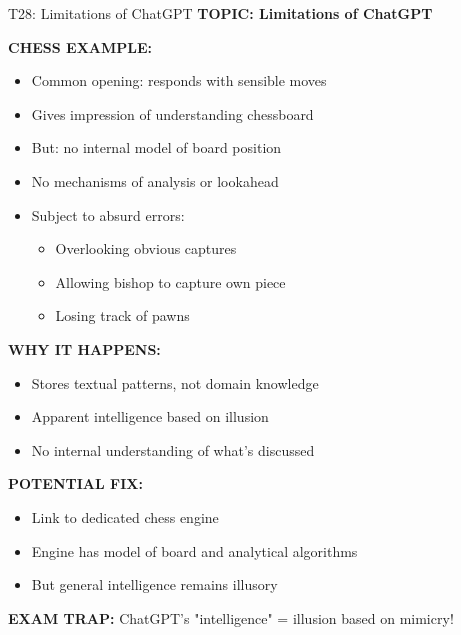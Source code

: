 \documentclass[8pt]{beamer}
\begin{document}
	\begin{frame}{T28: Limitations of ChatGPT}
		\fontsize{6.5}{7.5}\selectfont
		\textbf{TOPIC: Limitations of ChatGPT}
		
		\vspace{0.1cm}
		\textbf{CHESS EXAMPLE:}
		\begin{itemize}
			\item Common opening: responds with sensible moves
			\item Gives impression of understanding chessboard
			\item But: no internal model of board position
			\item No mechanisms of analysis or lookahead
			\item Subject to absurd errors:
			\begin{itemize}
				\item Overlooking obvious captures
				\item Allowing bishop to capture own piece
				\item Losing track of pawns
			\end{itemize}
		\end{itemize}
		
		\vspace{0.1cm}
		\textbf{WHY IT HAPPENS:}
		\begin{itemize}
			\item Stores textual patterns, not domain knowledge
			\item Apparent intelligence based on illusion
			\item No internal understanding of what's discussed
		\end{itemize}
		
		\vspace{0.1cm}
		\textbf{POTENTIAL FIX:}
		\begin{itemize}
			\item Link to dedicated chess engine
			\item Engine has model of board and analytical algorithms
			\item But general intelligence remains illusory
		\end{itemize}
		
		\textcolor{myred}{\textbf{EXAM TRAP:}} ChatGPT's "intelligence" = \textcolor{myblue}{illusion based on mimicry}!
	\end{frame}
	
	
\end{document}
